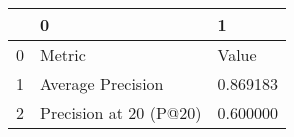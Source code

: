 \begin{tabular}{lll}
\toprule
 & 0 & 1 \\
\midrule
0 & Metric & Value \\
1 & Average Precision & 0.869183 \\
2 & Precision at 20 (P@20) & 0.600000 \\
\bottomrule
\end{tabular}
